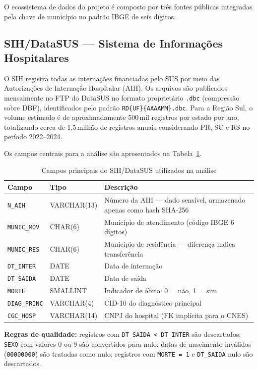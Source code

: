 \documentclass[12pt]{article}
\begin{document}
O ecossistema de dados do projeto é composto por três fontes públicas
integradas pela chave de município no padrão IBGE de seis dígitos.

\subsection{SIH/DataSUS — Sistema de Informações Hospitalares}

O SIH registra todas as internações financiadas pelo SUS por meio das
Autorizações de Internação Hospitalar (AIH). Os arquivos são publicados
mensalmente no FTP do DataSUS no formato proprietário \texttt{.dbc}
(compressão sobre DBF), identificados pelo padrão
\texttt{RD\{UF\}\{AAAAMM\}.dbc}. Para a Região Sul, o volume estimado é de
aproximadamente 500\,mil registros por estado por ano, totalizando cerca de
1,5\,milhão de registros anuais considerando PR, SC e RS no período 2022--2024.

Os campos centrais para a análise são apresentados na Tabela~\ref{tab:sih}.

\begin{table}[ht]
\centering
\caption{Campos principais do SIH/DataSUS utilizados na análise}
\label{tab:sih}
\begin{tabularx}{\textwidth}{llX}
\toprule
\textbf{Campo} & \textbf{Tipo} & \textbf{Descrição} \\
\midrule
\texttt{N\_AIH}     & VARCHAR(13) & Número da AIH — dado sensível, armazenado apenas como hash SHA-256 \\
\texttt{MUNIC\_MOV} & CHAR(6)     & Município de atendimento (código IBGE 6 dígitos) \\
\texttt{MUNIC\_RES} & CHAR(6)     & Município de residência — diferença indica transferência \\
\texttt{DT\_INTER}  & DATE        & Data de internação \\
\texttt{DT\_SAIDA}  & DATE        & Data de saída \\
\texttt{MORTE}      & SMALLINT    & Indicador de óbito: 0 = não, 1 = sim \\
\texttt{DIAG\_PRINC}& VARCHAR(4)  & CID-10 do diagnóstico principal \\
\texttt{CGC\_HOSP}  & VARCHAR(14) & CNPJ do hospital (FK implícita para o CNES) \\
\bottomrule
\end{tabularx}
\end{table}

\noindent\textbf{Regras de qualidade:} registros com \texttt{DT\_SAIDA < DT\_INTER}
são descartados; \texttt{SEXO} com valores 0 ou 9 são convertidos para nulo;
datas de nascimento inválidas (\texttt{00000000}) são tratadas como nulo;
registros com \texttt{MORTE = 1} e \texttt{DT\_SAIDA} nulo são descartados.
\end{document}
